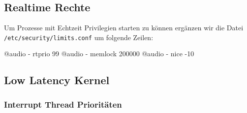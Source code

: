     \subsection{Realtime Rechte}

      Um Prozesse mit Echtzeit Privilegien starten zu können ergänzen
      wir die Datei {\tt /etc/security/limits.conf} um folgende Zeilen:

      \starttyping
      @audio - rtprio 99
      @audio - memlock 200000
      @audio - nice -10
      \stoptyping

    \subsection{Low Latency Kernel}
      \subsubsection{Interrupt Thread Prioritäten}


